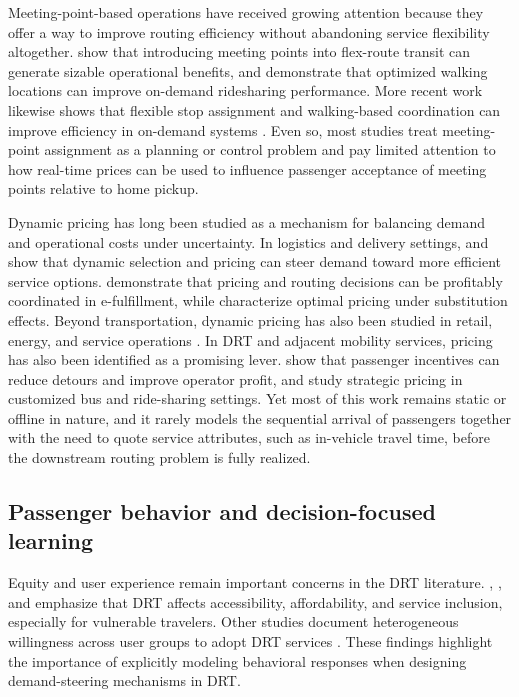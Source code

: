 \documentclass[preprint,12pt,authoryear]{elsarticle}
\begin{document}
Meeting-point-based operations have received growing attention because they offer a way to improve routing efficiency without abandoning service flexibility altogether. \citet{zheng2019} show that introducing meeting points into flex-route transit can generate sizable operational benefits, and \citet{fielbaum2021} demonstrate that optimized walking locations can improve on-demand ridesharing performance. More recent work likewise shows that flexible stop assignment and walking-based coordination can improve efficiency in on-demand systems \citep{wu2025,zhang2025,li2025,pellegrini2025,yan2025}. Even so, most studies treat meeting-point assignment as a planning or control problem and pay limited attention to how real-time prices can be used to influence passenger acceptance of meeting points relative to home pickup.

Dynamic pricing has long been studied as a mechanism for balancing demand and operational costs under uncertainty. In logistics and delivery settings, \citet{galiullina2024} and \citet{akkerman2025} show that dynamic selection and pricing can steer demand toward more efficient service options. \citet{yang2016} demonstrate that pricing and routing decisions can be profitably coordinated in e-fulfillment, while \citet{dong2009} characterize optimal pricing under substitution effects. Beyond transportation, dynamic pricing has also been studied in retail, energy, and service operations \citep{kayikci2022,chen2017,zhao2021}. In DRT and adjacent mobility services, pricing has also been identified as a promising lever. \citet{wang2021} show that passenger incentives can reduce detours and improve operator profit, and \citet{li2021} study strategic pricing in customized bus and ride-sharing settings. Yet most of this work remains static or offline in nature, and it rarely models the sequential arrival of passengers together with the need to quote service attributes, such as in-vehicle travel time, before the downstream routing problem is fully realized.

\subsection{Passenger behavior and decision-focused learning}

Equity and user experience remain important concerns in the DRT literature. \citet{liezenga2024}, \citet{miller2016}, and \citet{shang2022} emphasize that DRT affects accessibility, affordability, and service inclusion, especially for vulnerable travelers. Other studies document heterogeneous willingness across user groups to adopt DRT services \citep{knierim2021}. These findings highlight the importance of explicitly modeling behavioral responses when designing demand-steering mechanisms in DRT.
\end{document}
